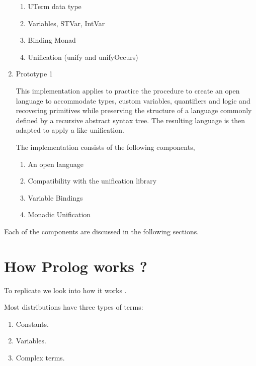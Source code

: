 \documentclass[thesis-solanki.tex]{subfiles}
\begin{document}
\begin{enumerate}
\begin{enumerate}
\item UTerm data type

\item Variables, STVar, IntVar

\item Binding Monad

\item Unification (unify and unifyOccurs)
\end{enumerate}

\item Prototype 1

This implementation applies to practice the procedure to create an open language to accommodate types, custom variables, quantifiers and 
logic and recovering primitives while preserving the structure of a language commonly defined by a recursive abstract syntax tree. The 
resulting language is then adapted to apply a  like unification.

The implementation consists of the following components,
\begin{enumerate}
\item An open language

\item Compatibility with the unification library \cite{unification-fd-lib}

\item Variable Bindings

\item Monadic Unification

\end{enumerate}
\end{enumerate}  

Each of the components are discussed in the following sections.


\section{How Prolog works ?}
To replicate  we look into how it works \cite{webiste:learnprolognow}.

Most  distributions have three types of terms:
\begin{enumerate}
\item Constants.

\item Variables.

\item Complex terms.
\end{enumerate}
\end{document}
